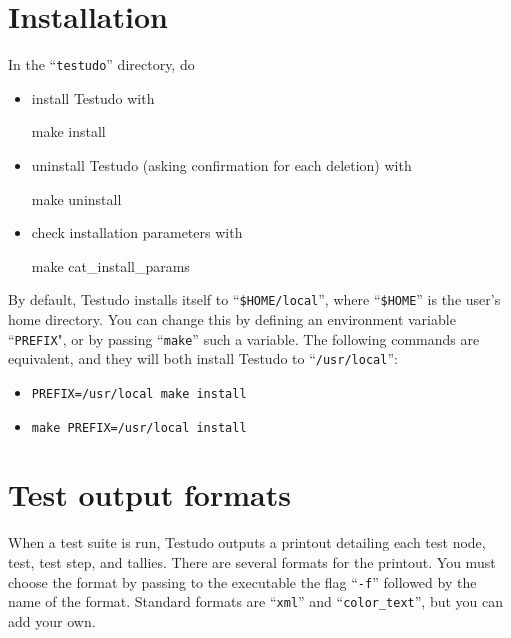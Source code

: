 \documentclass[twoside, a4paper, article]{memoir}
\begin{document}
\cleartoevenpage


\newlength\pdfpagehoroffset
\setlength\pdfpagehoroffset{\spinemargin}
\addtolength{}
\addtolength\pdfpagehoroffset{-.5\paperwidth}




\mainmatter


\chapter{Installation}

In the ``\texttt{testudo}'' directory, do
\begin{itemize}
\item install Testudo with
\begin{bashlisting}
make install
\end{bashlisting}
\item uninstall Testudo (asking confirmation for each deletion) with
\begin{bashlisting}
make uninstall
\end{bashlisting}
\item check installation parameters with
\begin{bashlisting}
make cat_install_params
\end{bashlisting}
\end{itemize}

By default, Testudo installs itself to ``\texttt{\$HOME/local}'', where
``\texttt{\$HOME}'' is the user's home directory.  You can change this by
defining an environment variable ``\texttt{PREFIX}", or by passing
``\texttt{make}'' such a variable.  The following commands are equivalent, and
they will both install Testudo to ``\texttt{/usr/local}'':
\begin{itemize}
\item \texttt{PREFIX=/usr/local make install}
\item \texttt{make PREFIX=/usr/local install}
\end{itemize}


\chapter{Test output formats}
\label{cha:test-output-formats}

When a test suite is run, Testudo outputs a printout detailing each test node,
test, test step, and tallies.  There are several formats for the printout.  You
must choose the format by passing to the executable the flag ``\texttt{-f}''
followed by the name of the format.  Standard formats are ``\texttt{xml}'' and
``\texttt{color\_text}'', but you can add your own.
\end{document}
